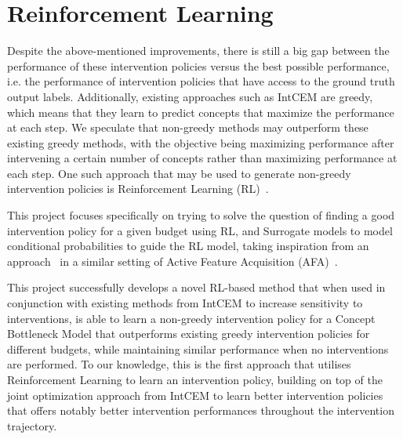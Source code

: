 \documentclass[../main.tex]{subfiles}
\begin{document}
\section{Reinforcement Learning}
Despite the above-mentioned improvements, there is still a big gap between the
performance
of these intervention policies versus the best possible performance, i.e. the performance of 
intervention policies that have access to the ground truth output labels.
Additionally, existing approaches such as IntCEM are greedy, which means that
they learn to predict concepts that maximize the performance at each step.
We speculate that non-greedy methods may outperform 
these existing greedy methods, with the objective being maximizing 
performance after intervening a certain number of concepts rather than maximizing 
performance at each step. 
One such approach that may be used to generate non-greedy intervention policies 
is Reinforcement Learning (RL)~\cite{rl}.

This project focuses specifically on trying to solve the 
question of finding a good intervention policy for a given 
budget using RL, and Surrogate models to model conditional 
probabilities to guide the RL model, taking inspiration
from an approach~\cite{gsmrl} in a similar setting of
Active Feature Acquisition (AFA)~\cite{afa}.

This project successfully develops a novel RL-based method
that when used in conjunction with
existing methods from IntCEM to increase sensitivity
to interventions, is able to learn a non-greedy intervention policy
for a Concept Bottleneck Model that outperforms
existing 
greedy intervention policies for different budgets, 
while maintaining similar performance
when no interventions are performed. To our knowledge,
this is the first approach that utilises Reinforcement Learning
to learn an intervention policy, building on top of the
joint optimization approach from IntCEM to learn better intervention
policies that offers notably better intervention performances
throughout the intervention trajectory.
\end{document}
